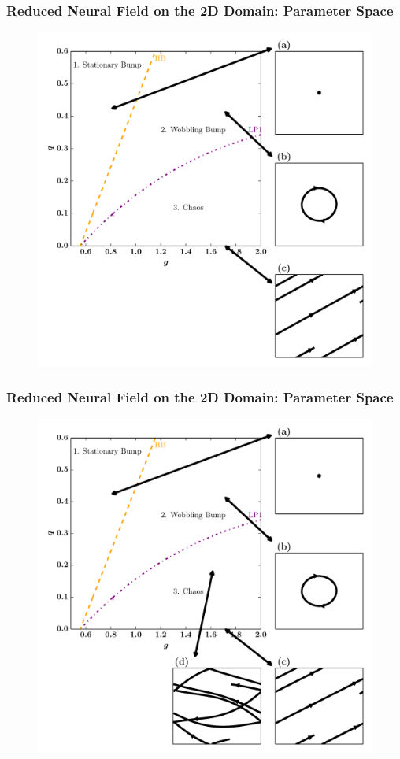 \documentclass{beamer}
\begin{document}
\begin{frame}
\frametitle{Reduced Neural Field on the 2D Domain: Parameter Space}
\begin{figure}
 \includegraphics[width=.6\textwidth]{twod_phase_2par3.pdf}
\end{figure}
\end{frame}

\begin{frame}
\frametitle{Reduced Neural Field on the 2D Domain: Parameter Space}
\begin{figure}
 \includegraphics[width=.6\textwidth]{twod_phase_2par4.pdf}
\end{figure}
\end{frame}
\end{document}
